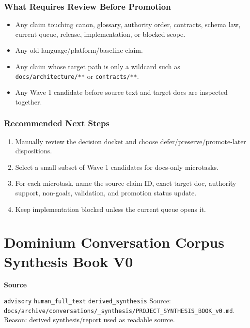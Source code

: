 \documentclass[9pt,a4paper,openany]{book}
\newcommand{\vonecallout}[3]{\par\medskip\noindent\begingroup\setlength{\fboxsep}{7pt}\colorbox{DomCalloutBg}{\parbox{0.94\linewidth}{\textbf{\textcolor{#1}{#2}}\par #3}}\endgroup\par\medskip}
\begin{document}
\subsubsection{What Requires Review Before Promotion}

\begin{itemize}
\item Any claim touching canon, glossary, authority order, contracts, schema law, current queue, release, implementation, or blocked scope.\allowbreak{}
\item Any old language/\allowbreak{}platform/\allowbreak{}baseline claim.\allowbreak{}
\item Any claim whose target path is only a wildcard such as \texttt{docs/\allowbreak{}architecture/\allowbreak{}**} or \texttt{contracts/\allowbreak{}**}.\allowbreak{}
\item Any Wave 1 candidate before source text and target docs are inspected together.\allowbreak{}
\end{itemize}

\subsubsection{Recommended Next Steps}

\begin{enumerate}
\item Manually review the decision docket and choose defer/\allowbreak{}preserve/\allowbreak{}promote-\allowbreak{}later dispositions.\allowbreak{}
\item Select a small subset of Wave 1 candidates for docs-\allowbreak{}only microtasks.\allowbreak{}
\item For each microtask, name the source claim ID, exact target doc, authority support, non-\allowbreak{}goals, validation, and promotion status update.\allowbreak{}
\item Keep implementation blocked unless the current queue opens it.\allowbreak{}
\end{enumerate}



\section{Dominium Conversation Corpus Synthesis Book V0}

\vonecallout{DomSlate}{Source}{\texttt{advisory} \texttt{human\_\allowbreak{}full\_\allowbreak{}text} \texttt{derived\_\allowbreak{}synthesis} Source: \texttt{docs/\allowbreak{}archive/\allowbreak{}conversations/\allowbreak{}\_\allowbreak{}synthesis/\allowbreak{}PROJECT\_\allowbreak{}SYNTHESIS\_\allowbreak{}BOOK\_\allowbreak{}v0.\allowbreak{}md}.\allowbreak{} Reason: derived synthesis/\allowbreak{}report used as readable source.\allowbreak{}}
\end{document}
